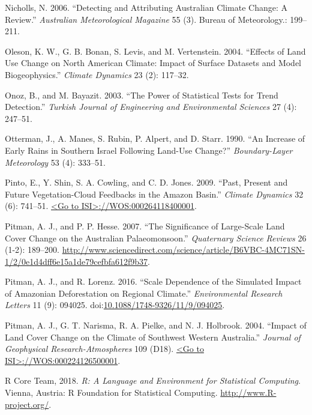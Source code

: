 \documentclass[]{elsarticle} %
\theoremstyle{definition}
\theoremstyle{definition}
\theoremstyle{definition}
\theoremstyle{remark}
\begin{document}
\hypertarget{ref-Nicholls2006}{}
Nicholls, N. 2006. ``Detecting and Attributing Australian Climate
Change: A Review.'' \emph{Australian Meteorological Magazine} 55 (3).
Bureau of Meteorology.: 199--211.

\hypertarget{ref-Oleson2004}{}
Oleson, K. W., G. B. Bonan, S. Levis, and M. Vertenstein. 2004.
``Effects of Land Use Change on North American Climate: Impact of
Surface Datasets and Model Biogeophysics.'' \emph{Climate Dynamics} 23
(2): 117--32.

\hypertarget{ref-Onoz2003}{}
Onoz, B., and M. Bayazit. 2003. ``The Power of Statistical Tests for
Trend Detection.'' \emph{Turkish Journal of Engineering and
Environmental Sciences} 27 (4): 247--51.

\hypertarget{ref-Otterman1990}{}
Otterman, J., A. Manes, S. Rubin, P. Alpert, and D. Starr. 1990. ``An
Increase of Early Rains in Southern Israel Following Land-Use Change?''
\emph{Boundary-Layer Meteorology} 53 (4): 333--51.

\hypertarget{ref-Pinto2009}{}
Pinto, E., Y. Shin, S. A. Cowling, and C. D. Jones. 2009. ``Past,
Present and Future Vegetation-Cloud Feedbacks in the Amazon Basin.''
\emph{Climate Dynamics} 32 (6): 741--51.
\href{\%3CGo\%20to\%20ISI\%3E://WOS:000264118400001}{\textless{}Go to ISI\textgreater{}://WOS:000264118400001}.

\hypertarget{ref-Pitman2007}{}
Pitman, A. J., and P. P. Hesse. 2007. ``The Significance of Large-Scale
Land Cover Change on the Australian Palaeomonsoon.'' \emph{Quaternary
Science Reviews} 26 (1-2): 189--200.
\url{http://www.sciencedirect.com/science/article/B6VBC-4MC71SN-1/2/0e1d4dff6e15a1de79cefbfa612f9b37}.

\hypertarget{ref-pitman_scale_2016}{}
Pitman, A. J., and R. Lorenz. 2016. ``Scale Dependence of the Simulated
Impact of Amazonian Deforestation on Regional Climate.''
\emph{Environmental Research Letters} 11 (9): 094025.
doi:\href{https://doi.org/10.1088/1748-9326/11/9/094025}{10.1088/1748-9326/11/9/094025}.

\hypertarget{ref-Pitman2004}{}
Pitman, A. J., G. T. Narisma, R. A. Pielke, and N. J. Holbrook. 2004.
``Impact of Land Cover Change on the Climate of Southwest Western
Australia.'' \emph{Journal of Geophysical Research-Atmospheres} 109
(D18).
\href{\%3CGo\%20to\%20ISI\%3E://WOS:000224126500001}{\textless{}Go to ISI\textgreater{}://WOS:000224126500001}.

\hypertarget{ref-Rstats2018}{}
R Core Team, 2018. \emph{R: A Language and Environment for Statistical
Computing}. Vienna, Austria: R Foundation for Statistical Computing.
\url{http://www.R-project.org/}.
\end{document}
